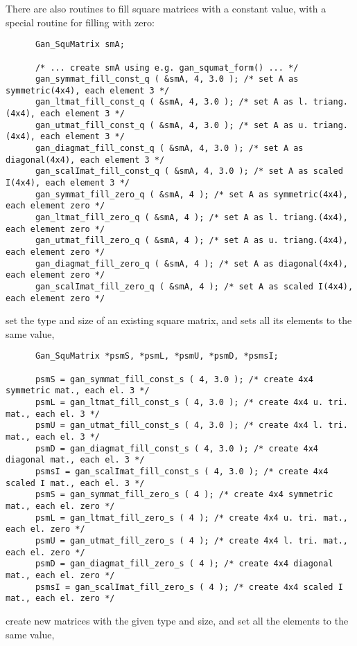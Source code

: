 There are also routines to fill square matrices with a constant value, with
a special routine for filling with zero:
\begin{verbatim}
      Gan_SquMatrix smA;

      /* ... create smA using e.g. gan_squmat_form() ... */
      gan_symmat_fill_const_q ( &smA, 4, 3.0 ); /* set A as symmetric(4x4), each element 3 */
      gan_ltmat_fill_const_q ( &smA, 4, 3.0 ); /* set A as l. triang.(4x4), each element 3 */
      gan_utmat_fill_const_q ( &smA, 4, 3.0 ); /* set A as u. triang.(4x4), each element 3 */
      gan_diagmat_fill_const_q ( &smA, 4, 3.0 ); /* set A as diagonal(4x4), each element 3 */
      gan_scalImat_fill_const_q ( &smA, 4, 3.0 ); /* set A as scaled I(4x4), each element 3 */
      gan_symmat_fill_zero_q ( &smA, 4 ); /* set A as symmetric(4x4), each element zero */
      gan_ltmat_fill_zero_q ( &smA, 4 ); /* set A as l. triang.(4x4), each element zero */
      gan_utmat_fill_zero_q ( &smA, 4 ); /* set A as u. triang.(4x4), each element zero */
      gan_diagmat_fill_zero_q ( &smA, 4 ); /* set A as diagonal(4x4), each element zero */
      gan_scalImat_fill_zero_q ( &smA, 4 ); /* set A as scaled I(4x4), each element zero */
\end{verbatim}
set the type and size of an existing square matrix, and sets all its elements
to the same value,
\begin{verbatim}
      Gan_SquMatrix *psmS, *psmL, *psmU, *psmD, *psmsI;

      psmS = gan_symmat_fill_const_s ( 4, 3.0 ); /* create 4x4 symmetric mat., each el. 3 */
      psmL = gan_ltmat_fill_const_s ( 4, 3.0 ); /* create 4x4 u. tri. mat., each el. 3 */
      psmU = gan_utmat_fill_const_s ( 4, 3.0 ); /* create 4x4 l. tri. mat., each el. 3 */
      psmD = gan_diagmat_fill_const_s ( 4, 3.0 ); /* create 4x4 diagonal mat., each el. 3 */
      psmsI = gan_scalImat_fill_const_s ( 4, 3.0 ); /* create 4x4 scaled I mat., each el. 3 */
      psmS = gan_symmat_fill_zero_s ( 4 ); /* create 4x4 symmetric mat., each el. zero */
      psmL = gan_ltmat_fill_zero_s ( 4 ); /* create 4x4 u. tri. mat., each el. zero */
      psmU = gan_utmat_fill_zero_s ( 4 ); /* create 4x4 l. tri. mat., each el. zero */
      psmD = gan_diagmat_fill_zero_s ( 4 ); /* create 4x4 diagonal mat., each el. zero */
      psmsI = gan_scalImat_fill_zero_s ( 4 ); /* create 4x4 scaled I mat., each el. zero */
\end{verbatim}
create new matrices with the given type and size, and set all the elements to
the same value,

